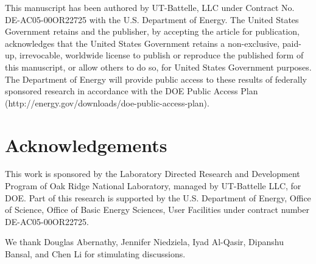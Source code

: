 \documentclass{article}
\begin{document}
This manuscript has been authored by UT-Battelle, LLC under Contract No.
DE-AC05-00OR22725 with the U.S. Department of Energy. The United States
Government retains and the publisher, by accepting the article for
publication, acknowledges that the United States Government retains a
non-exclusive, paid-up, irrevocable, worldwide license to publish or
reproduce the published form of this manuscript, or allow others to do
so, for United States Government purposes. The Department of Energy will
provide public access to these results of federally sponsored research
in accordance with the DOE Public Access Plan
(http://energy.gov/downloads/doe-public-access-plan).

\section{Acknowledgements}\label{acknowledgements}
This work is sponsored by the Laboratory Directed Research and
Development Program of Oak Ridge National Laboratory, managed by
UT-Battelle LLC, for DOE. Part of this research is supported by the U.S.
Department of Energy, Office of Science, Office of Basic Energy
Sciences, User Facilities under contract number DE-AC05-00OR22725.

We thank Douglas Abernathy, Jennifer Niedziela, Iyad Al-Qasir,
Dipanshu Bansal, and Chen Li for stimulating discussions.




\end{document}
